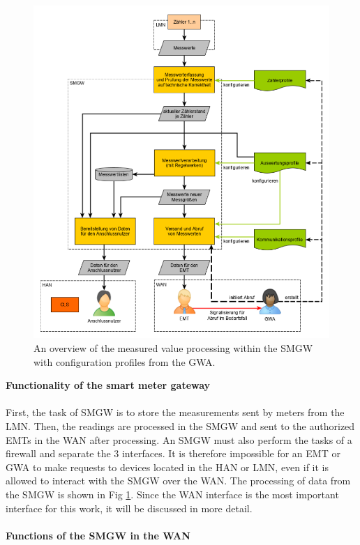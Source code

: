 \begin{figure}[tbp]
  \centering
  \includegraphics[width=1\textwidth]{images/Messwertverarbeitung.png}
  \caption[Measured Value Processing in a SMGW]{An overview of the measured value processing within the SMGW with configuration profiles from the GWA.}
  \label{fig:value_processing}
\end{figure}
\textbf{Functionality of the smart meter gateway}
\\
\\
First, the task of SMGW is to store the measurements sent by meters from the LMN. Then, the readings are processed in the SMGW and sent to the authorized EMTs in the WAN after processing. An SMGW must also perform the tasks of a firewall and separate the 3 interfaces. It is therefore impossible for an EMT or GWA to make requests to devices located in the HAN or LMN, even if it is allowed to interact with the SMGW over the WAN. The processing of data from the SMGW is shown in Fig \ref{fig:value_processing}. Since the WAN interface is the most important interface for this work, it will be discussed in more detail.\\
\\
\textbf{Functions of the SMGW in the WAN}
